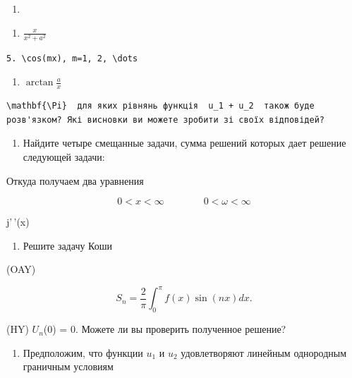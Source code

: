 \documentclass[
  ukrainian,
]{article}
\providecommand{\tightlist}{%
  \setlength{\itemsep}{0pt}\setlength{\parskip}{0pt}}
\begin{document}
\begin{enumerate}
\def\labelenumi{\alph{enumi})}
\tightlist
\item
\end{enumerate}

\begin{enumerate}
\def\labelenumi{\arabic{enumi}.}
\setcounter{enumi}{6}
\tightlist
\item
  \(\frac{x}{x^2+a^2}\)
\end{enumerate}

\begin{verbatim}
5. \cos(mx), m=1, 2, \dots
\end{verbatim}

\begin{enumerate}
\def\labelenumi{\arabic{enumi}.}
\setcounter{enumi}{8}
\tightlist
\item
  \(\arctan \frac{a}{x}\)
\end{enumerate}

\begin{verbatim}
\mathbf{\Pi}  для яких рівнянь функція  u_1 + u_2  також буде розв'язком? Які висновки ви можете зробити зі своїх відповідей?
\end{verbatim}

\begin{enumerate}
\def\labelenumi{\arabic{enumi}.}
\setcounter{enumi}{3}
\tightlist
\item
  Найдите четыре смещанные задачи, сумма решений которых дает решение
  следующей задачи:
\end{enumerate}

Откуда получаем два уравнения

\[
0 < x < \infty \qquad \qquad 0 < \omega < \infty
\]

j'\,'(x)

\begin{enumerate}
\def\labelenumi{\arabic{enumi}.}
\setcounter{enumi}{4}
\tightlist
\item
  Решите задачу Коши
\end{enumerate}

(OAY)

\[
S_n = \frac{2}{\pi} \int_0^{\pi} f(x) \sin(nx) dx.
\]

(HY) \(U_n\)(0) = 0. Можете ли вы проверить полученное решение?

\begin{enumerate}
\def\labelenumi{\arabic{enumi}.}
\setcounter{enumi}{5}
\tightlist
\item
  Предположим, что функции \(u_1\) и \(u_2\) удовлетворяют линейным
  однородным граничным условиям
\end{enumerate}
\end{document}
